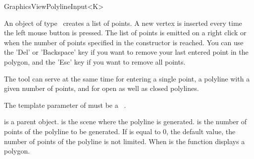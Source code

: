\begin{ccRefClass}[Qt::]{GraphicsViewPolylineInput<K>}

\ccDefinition
An object of type \ccRefName\ creates a list of points. A new 
vertex is inserted every time the left mouse button is pressed.
The list of points is emitted on a right click or when the number of
points specified in the constructor is reached. You can use the 'Del'
or 'Backspace' key if you want to remove your last entered point in the polygon,
and the 'Esc' key if you want to remove all points.

The tool can serve at the same time for entering a single point,
a polyline with a given number of points, and for open as well as closed
polylines.


\ccParameters

The template parameter of  must be a \cgal\ . 

\ccInheritsFrom
{}

\ccGlue

\ccCreation
{}

{ is a parent object.  is the scene where the polyline is generated.  is the
  number of points of the polyline to be generated. If  is equal to 0,
  the default value, the number of points of the polyline is not
  limited. When  is  the function displays a
  polygon.}



\end{ccRefClass}







